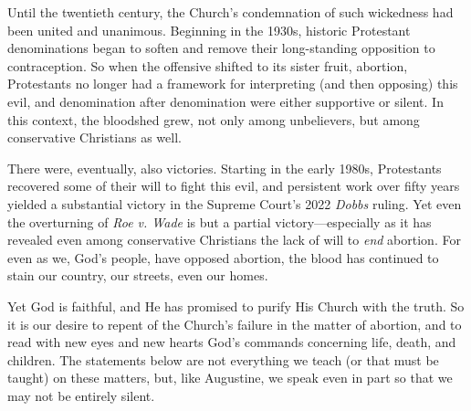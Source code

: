 \documentclass[
]{book}
\begin{document}
Until the twentieth century, the Church's condemnation of such wickedness had been united and unanimous. Beginning in the 1930s, historic Protestant denominations began to soften and remove their long-standing opposition to contraception. So when the offensive shifted to its sister fruit, abortion, Protestants no longer had a framework for interpreting (and then opposing) this evil, and denomination after denomination were either supportive or silent. In this context, the bloodshed grew, not only among unbelievers, but among conservative Christians as well.

There were, eventually, also victories. Starting in the early 1980s, Protestants recovered some of their will to fight this evil, and persistent work over fifty years yielded a substantial victory in the Supreme Court's 2022 \emph{Dobbs} ruling. Yet even the overturning of \emph{Roe v. Wade} is but a partial victory---especially as it has revealed even among conservative Christians the lack of will to \emph{end} abortion. For even as we, God's people, have opposed abortion, the blood has continued to stain our country, our streets, even our homes.

Yet God is faithful, and He has promised to purify His Church with the truth. So it is our desire to repent of the Church's failure in the matter of abortion, and to read with new eyes and new hearts God's commands concerning life, death, and children. The statements below are not everything we teach (or that must be taught) on these matters, but, like Augustine, we speak even in part so that we may not be entirely silent.
\end{document}
